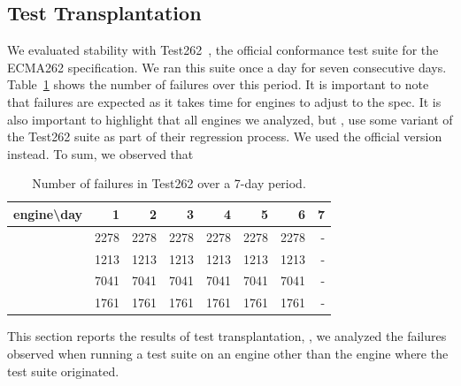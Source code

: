 \documentclass[10pt,conference,anonymous]{IEEEtran}
\begin{document}
\subsection{Test Transplantation}
\label{sec:transplantation}
\label{sec:stability}
We evaluated stability with Test262~\cite{ecma262-conformance-suite},
the official \js{} conformance test suite for the ECMA262
specification. We ran this suite once a day for seven consecutive
days. Table~\ref{tab:test262} shows the number of failures over this
period. It is important to note that failures are expected as it takes
time for engines to adjust to the spec. It is also important to
highlight that all engines we analyzed, but \chakra{}, use some
variant of the Test262 suite as part of their regression
process. We used the official version
instead. To sum, we observed
that  

\begin{table}[h]
  \centering
  \caption{\label{tab:test262}Number of failures in Test262 over
    a 7-day period.}
  \begin{tabular}{crrrrrrr}
    \toprule
    engine\textbackslash{}day& 1 & 2 & 3 & 4 & 5 & 6 & 7 \\
    \midrule
    \jsc{} & 2278 & 2278 & 2278 & 2278 & 2278 & 2278 & - \\
    \veight{} & 1213 & 1213 & 1213 & 1213 & 1213 & 1213 & - \\
    \chakra{} & 7041 & 7041 & 7041 & 7041 & 7041 & 7041 & - \\
    \smonkey{} & 1761 & 1761 & 1761 & 1761 & 1761 & 1761 & - \\
    \bottomrule 
  \end{tabular}
\end{table}



This section reports the results of test transplantation, \ie{}, we
analyzed the failures observed when running a test suite on an engine
other than the engine where the test suite
originated.
\end{document}
